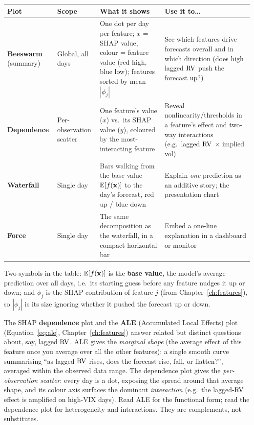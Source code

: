 \begin{center}
\renewcommand{\arraystretch}{1.3}
\begin{tabular}{@{}p{2.6cm}p{2.4cm}p{4.0cm}p{4.2cm}@{}}
\toprule
\textbf{Plot} & \textbf{Scope} & \textbf{What it shows} & \textbf{Use it to\ldots} \\
\midrule
\textbf{Beeswarm} (summary)
  & Global, all days
  & One dot per day per feature; $x$ = SHAP value, colour = feature value
    (red high, blue low); features sorted by mean $|\phi_j|$
  & See which features drive forecasts overall and in which direction
    (does high lagged $\operatorname{RV}$ push the forecast up?) \\[4pt]
\textbf{Dependence}
  & Per-observation scatter
  & One feature's value ($x$) vs.\ its SHAP value ($y$), coloured by the
    most-interacting feature
  & Reveal nonlinearity/thresholds in a feature's effect and two-way
    interactions (e.g.\ lagged $\operatorname{RV}$ $\times$ implied vol) \\[4pt]
\textbf{Waterfall}
  & Single day
  & Bars walking from the base value $\mathbb{E}[f(\mathbf{x})]$ to the day's forecast,
    red up / blue down
  & Explain \emph{one} prediction as an additive story; the presentation
    chart \\[4pt]
\textbf{Force}
  & Single day
  & The same decomposition as the waterfall, in a compact horizontal bar
  & Embed a one-line explanation in a dashboard or monitor \\
\bottomrule
\end{tabular}
\end{center}

Two symbols in the table: $\mathbb{E}[f(\mathbf{x})]$ is the \textbf{base value}, the model's
average prediction over all days, i.e.\ its starting guess before any feature
nudges it up or down; and $\phi_j$ is the SHAP contribution of feature $j$
(from Chapter~\ref{ch:features}), so $|\phi_j|$ is its size ignoring whether
it pushed the forecast up or down.

\begin{keyidea}
The SHAP \textbf{dependence} plot and the \textbf{ALE} (Accumulated Local
Effects) plot
(Equation~\ref{eq:ale}, Chapter~\ref{ch:features}) answer related but
distinct questions about, say, lagged $\operatorname{RV}$.  ALE gives the
\emph{marginal shape} (the average effect of this feature once you average
over all the other features): a single smooth curve summarising ``as lagged
$\operatorname{RV}$ rises, does the forecast rise, fall, or flatten?'', averaged within the
observed data range.  The dependence plot gives the \emph{per-observation
scatter}: every day is a dot, exposing the spread around that average shape,
and its colour axis surfaces the dominant \emph{interaction} (e.g.\ the
lagged-$\operatorname{RV}$ effect is amplified on high-VIX days).  Read ALE for the
functional form; read the dependence plot for heterogeneity and
interactions.  They are complements, not substitutes.
\end{keyidea}

